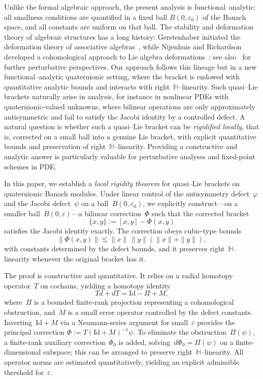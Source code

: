 \documentclass[10pt]{amsart}
\numberwithin{equation}{section}
\theoremstyle{remark}
\theoremstyle{definition}
\begin{document}
Unlike the formal algebraic approach, the present analysis is functional–analytic:
all smallness conditions are quantified in a fixed ball
$B(0,\varepsilon_0)$ of the Banach space, and all constants
are uniform on that ball.
The stability and deformation theory of algebraic structures has a long history: Gerstenhaber initiated the deformation theory of associative algebras~\cite{Gerstenhaber1964}, while Nijenhuis and Richardson developed a cohomological approach to Lie algebra deformations~\cite{NijenhuisRichardson1967}; see also~\cite{Fialowski2001} for further perturbative perspectives. Our approach follows this lineage but in a new functional--analytic quaternionic setting, where the bracket is endowed with quantitative analytic bounds and interacts with right~$\mathbb{H}$--linearity.
\medskip
\noindent
Such quasi--Lie brackets naturally arise in analysis, for instance in nonlinear PDEs with quaternionic-valued unknowns, where bilinear operations are only approximately antisymmetric and fail to satisfy the Jacobi identity by a controlled defect. A natural question is whether such a quasi--Lie bracket can be \emph{rigidified locally}, that is, corrected on a small ball into a genuine Lie bracket, with explicit quantitative bounds and preservation of right~$\mathbb{H}$--linearity. Providing a constructive and analytic answer is particularly valuable for perturbative analyses and fixed-point schemes in PDE.

\medskip
\noindent
In this paper, we establish a \emph{local rigidity theorem} for quasi--Lie brackets on quaternionic Banach modules. Under linear control of the antisymmetry defect~$\varphi$ and the Jacobi defect~$\psi$ on a ball~$B(0,\varepsilon_0)$, we explicitly construct—on a smaller ball~$B(0,\varepsilon)$—a bilinear correction~$\Phi$ such that the corrected bracket
\[
\{x,y\} := [x,y]-\Phi(x,y)
\]
satisfies the Jacobi identity exactly. The correction obeys cubic-type bounds
\[
\|\Phi(x,y)\| \lesssim \|x\|\,\|y\|(\|x\|+\|y\|),
\]
with constants determined by the defect bounds, and it preserves right~$\mathbb{H}$--linearity whenever the original bracket has it.

The proof is constructive and quantitative. It relies on a radial homotopy operator~$T$ on cochains, yielding a homotopy identity
\[
Td + dT = \mathrm{Id} - \Pi + M,
\]
where~$\Pi$ is a bounded finite-rank projection representing a cohomological obstruction, and~$M$ is a small error operator controlled by the defect constants. Inverting~$\mathrm{Id}+M$ via a Neumann-series argument for small~$\varepsilon$ provides the principal correction $\Phi := T(\mathrm{Id}+M)^{-1}\psi$. To eliminate the obstruction~$\Pi(\psi)$, a finite-rank auxiliary correction~$\Phi_0$ is added, solving~$d\Phi_0 = \Pi(\psi)$ on a finite-dimensional subspace; this can be arranged to preserve right~$\mathbb{H}$--linearity. All operator norms are estimated quantitatively, yielding an explicit admissible threshold for~$\varepsilon$.
\end{document}
